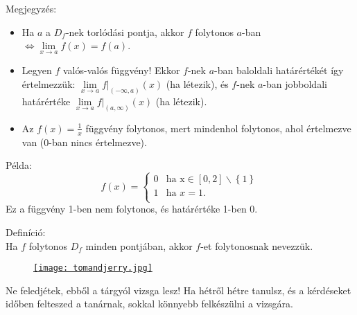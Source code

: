 \documentclass[12pt,a4paper]{scrartcl}
\providecommand{\tightlist}{%
  \setlength{\itemsep}{0pt}\setlength{\parskip}{0pt}}
\newenvironment{definicio}{}{}
\newenvironment{megjegyzes}{}{}
\newenvironment{pelda}{}{}
\newenvironment{ajanlofig}{\begin{figure}\begin{center}}{
\end{center}\end{figure}}
\begin{document}
\begin{megjegyzes}

Megjegyzés:

\begin{itemize}
\tightlist
\item
  Ha \(a\) a \(D_{f}\)-nek torlódási pontja, akkor \(f\) folytonos
  \(a\)-ban
  \(\left. \Leftrightarrow\underset{x\rightarrow a}{\lim}f\left( x \right) = f\left( a \right) \right.\).
\item
  Legyen \(f\) valós-valós függvény! Ekkor \(f\)-nek \(a\)-ban baloldali
  határértékét így értelmezzük:
  \(\underset{x\rightarrow a}{\lim}\left. f \right|_{({- \infty,a})}\left( x \right)\)
  (ha létezik), és \(f\)-nek \(a\)-ban jobboldali határértéke
  \(\underset{x\rightarrow a}{\lim}\left. f \right|_{({a,\infty})}\left( x \right)\)
  (ha létezik).
\item
  Az \(f\left( x \right) = \frac{1}{x}\) függvény folytonos, mert
  mindenhol folytonos, ahol értelmezve van (0-ban nincs értelmezve).
\end{itemize}

\end{megjegyzes}

\begin{pelda}

Példa: \[f\left( x \right) = \begin{cases}
0 & {\text{ha~x} \in \left\lbrack 0,2 \right\rbrack\backslash\left\{ 1 \right\}} \\
1 & {\text{ha~}x = 1.} \\
\end{cases}\] Ez a függvény 1-ben nem folytonos, és határértéke 1-ben 0.

\end{pelda}

\begin{definicio}

Definíció:\\
Ha \(f\) folytonos \(D_{f}\) minden pontjában, akkor \(f\)-et
folytonosnak nevezzük.

\end{definicio}

\begin{ajanlo}

\begin{ajanlofig}

\href{https://www.youtube.com/watch?v=qDMRDwMcKzA}{\texttt{[image: tomandjerry.jpg]}}

\end{ajanlofig}

Ne feledjétek, ebből a tárgyól vizsga lesz! Ha hétről hétre tanulsz, és
a kérdéseket időben felteszed a tanárnak, sokkal könnyebb felkészülni a
vizsgára.

\end{ajanlo}
\end{document}
